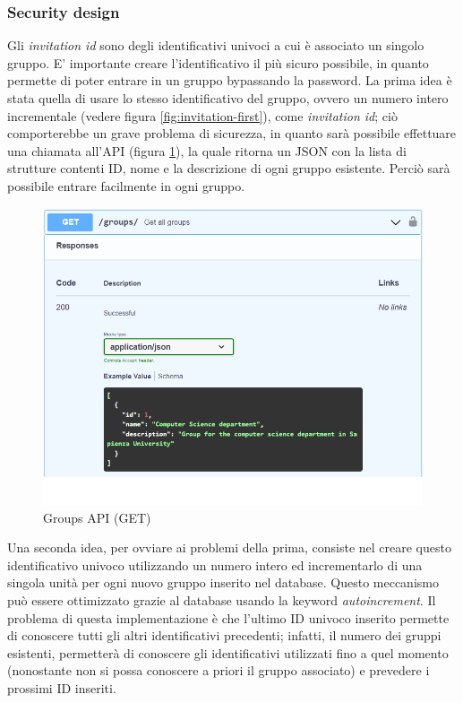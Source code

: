 \documentclass[main.tex]{subfiles}
\begin{document}
\subsubsection{Security design}
Gli \emph{invitation id} sono degli identificativi univoci a cui è associato un singolo gruppo. E' importante creare l'identificativo il più sicuro possibile, in quanto permette di poter entrare in un gruppo bypassando la password.\newline
La prima idea è stata quella di usare lo stesso identificativo del gruppo, ovvero un numero intero incrementale (vedere figura \ref{fig:invitation-first}), come \emph{invitation id}; ciò comporterebbe un grave problema di sicurezza, in quanto sarà possibile effettuare una chiamata all'API  (figura \ref{fig:groups}), la quale ritorna un JSON con la lista di strutture contenti ID, nome e la descrizione di ogni gruppo esistente. Perciò sarà possibile entrare facilmente in ogni gruppo.
\begin{figure}[H]
    \centering
    \includegraphics[width=1\linewidth]{img/add-link-task/groups.PNG}
    \caption{Groups API (GET)}
    \label{fig:groups}
\end{figure}
Una seconda idea, per ovviare ai problemi della prima, consiste nel creare questo identificativo univoco utilizzando un numero intero ed incrementarlo di una singola unità per ogni nuovo gruppo inserito nel database. Questo meccanismo può essere ottimizzato grazie al database usando la keyword \emph{autoincrement}. Il problema di questa implementazione è che l'ultimo ID univoco inserito permette di conoscere tutti gli altri identificativi precedenti; infatti, il numero dei gruppi esistenti, permetterà di conoscere gli identificativi utilizzati fino a quel momento (nonostante non si possa conoscere a priori il gruppo associato) e prevedere i prossimi ID inseriti.\newline
\end{document}
